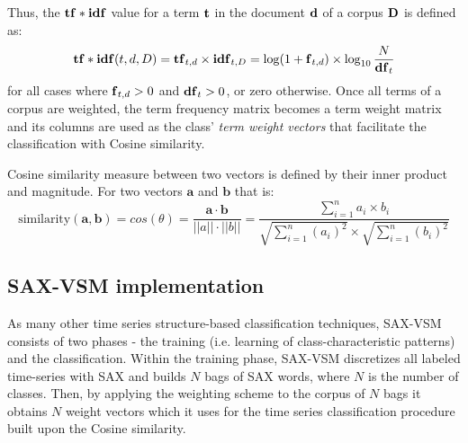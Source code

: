 Thus, the $\text{\textbf{tf}} \ast \text{\textbf{idf}}$ value for a term $\text{\textbf{t}}$ in the document 
$\text{\textbf{d}}$ of a corpus $\text{\textbf{D}}$ is defined as:
\begin{equation}
 \text{\textbf{tf}} \ast \text{\textbf{idf}}(t, d, D) =  \text{\textbf{tf}}_{t, d} \times \text{\textbf{idf}}_{t, D} = \log(1 + \text{\textbf{f}}_{t,d})
\times \log_{10}\frac{N}{\mbox{\textbf{df}}_{t}}
 \label{formula:tfidf}
\end{equation} 
for all cases where $\mbox{\textbf{f}}_{t,d}>0$ and $\mbox{\textbf{df}}_{t}>0$, or zero otherwise.
Once all terms of a corpus are weighted, the term frequency matrix becomes a term weight matrix and its columns 
are used as the class' \textit{term weight vectors} that facilitate the classification with Cosine similarity. 

Cosine similarity measure between two vectors is defined by their inner product and magnitude. 
For two vectors $\mathbf{a}$ and $\mathbf{b}$ that is:
\begin{equation}
\mbox{similarity}(\mathbf{a},\mathbf{b}) = cos(\theta) = 
\frac{ \mathbf{a} \cdot \mathbf{b} } {\left| \left| a \right| \right| \cdot \left| \left| b \right|\right|} =
\frac{ \sum\limits_{i=1}^{n}{a_{i} \times b_{i}} }{ \sqrt{\sum\limits_{i=1}^{n}{(a_{i})^2}} \times \sqrt{\sum\limits_{i=1}^{n}{(b_{i})^2}}}
\end{equation} 

\subsection{SAX-VSM implementation} \label{sax-vsm}
As many other time series structure-based classification techniques, SAX-VSM consists of two 
phases - the training (i.e. learning of class-characteristic patterns) and the classification. 
Within the training phase, SAX-VSM discretizes all labeled time-series with SAX and builds $N$ bags 
of SAX words, where $N$ is the number of classes. 
Then, by applying the \tfidf weighting scheme to the corpus of $N$ bags it obtains $N$ weight vectors 
which it uses for the time series classification procedure built upon the Cosine similarity.

